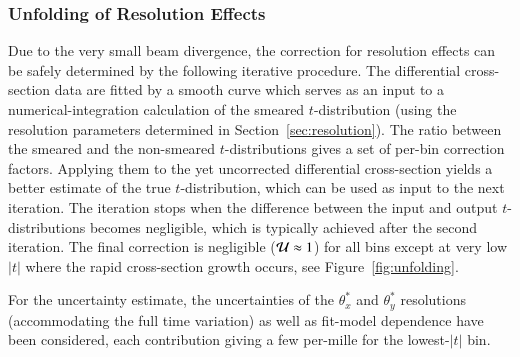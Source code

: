 \subsubsection{Unfolding of Resolution Effects}
\label{sec:unfolding}

Due to the very small beam divergence, the correction for resolution effects can be safely determined by the following iterative procedure. The differential cross-section data are fitted by a smooth curve which serves as an input to a numerical-integration calculation of the smeared $t$-distribution (using the resolution parameters determined in Section~\ref{sec:resolution}). The ratio between the smeared and the non-smeared $t$-distributions gives a set of per-bin correction factors. Applying them to the yet uncorrected differential cross-section yields a better estimate of the true $t$-distribution, which can be used as input to the next iteration. The iteration stops when the difference between the input and output $t$-distributions becomes negligible, which is typically achieved after the second iteration. The final correction is negligible (${\cal U} \approx 1$) for all bins except at very low $|t|$ where the rapid cross-section growth occurs, see Figure~\ref{fig:unfolding}.

For the uncertainty estimate, the uncertainties of the $\theta_x^*$ and $\theta_y^*$ resolutions (accommodating the full time variation) as well as fit-model dependence have been considered, each contribution giving a few per-mille for the lowest-$|t|$ bin.

